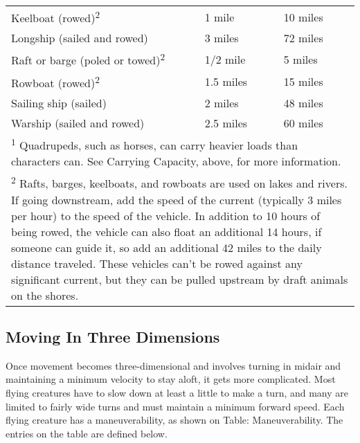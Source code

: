 \begin{table}[htb]
\begin{tabular}{l l l}
\hspace{1cm}Keelboat (rowed)\textsuperscript{2} & 1 mile & 10 miles\\
\hspace{1cm}Longship (sailed and rowed) & 3 miles & 72 miles\\
\hspace{1cm}Raft or barge (poled or towed)\textsuperscript{2} & 1/2 mile & 5 miles\\
\hspace{1cm}Rowboat (rowed)\textsuperscript{2} & 1.5 miles & 15 miles\\
\hspace{1cm}Sailing ship (sailed) & 2 miles & 48 miles\\
\hspace{1cm}Warship (sailed and rowed) & 2.5 miles & 60 miles\\
\multicolumn{3}{p{9.5cm}}{\textsuperscript{1} Quadrupeds, such as horses, can carry heavier loads than characters can. See Carrying Capacity, above, for more information.}\\
\multicolumn{3}{p{9.5cm}}{\textsuperscript{2} Rafts, barges, keelboats, and rowboats are used on lakes and rivers.
If going downstream, add the speed of the current (typically 3 miles per hour) to the speed of the vehicle. In addition to 10 hours of being rowed, the vehicle can also float an additional 14 hours, if someone can guide it, so add an additional 42 miles to the daily distance traveled. These vehicles can’t be rowed against any significant current, but they can be pulled upstream by draft animals on the shores.}\\
\end{tabular}
\end{table}

\subsection{Moving In Three Dimensions}

Once movement becomes three-dimensional and involves turning in midair and maintaining 
a minimum velocity to stay aloft, it gets more complicated. Most flying creatures 
have to slow down at least a little to make a turn, and many are limited to fairly 
wide turns and must maintain a minimum forward speed. Each flying creature has 
a maneuverability, as shown on Table: Maneuverability. The entries on the table 
are defined below.

